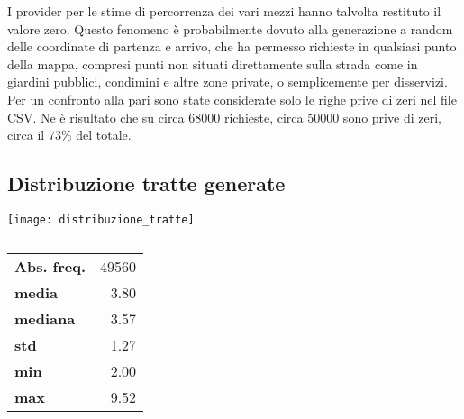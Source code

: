 I provider per le stime di percorrenza dei vari mezzi hanno talvolta restituto il valore zero. Questo fenomeno è probabilmente dovuto alla generazione a random delle coordinate di partenza e arrivo, che ha permesso richieste in qualsiasi punto della mappa, compresi punti non situati direttamente sulla strada come in giardini pubblici, condimini e altre zone private, o semplicemente per disservizi. Per un confronto alla pari sono state considerate solo le righe prive di zeri nel file CSV. Ne è risultato che su circa 68000 richieste, circa 50000 sono prive di zeri, circa il 73\% del totale.

\subsection{Distribuzione tratte generate}

\begin{center}
\texttt{[image: distribuzione\_tratte]}
\end{center}

\begin{table}[H]
	\centering
	\begin{tabular}{ | l r | }
		\hline
		\textbf{Abs. freq.} & 49560 \\
		\textbf{media} & 3.80 \\
		\textbf{mediana} & 3.57 \\
		\textbf{std} & 1.27 \\
		\textbf{min} & 2.00 \\
		\textbf{max} & 9.52 \\
		\hline
	\end{tabular}
	\caption{}
	\label{table:2}
\end{table}


















